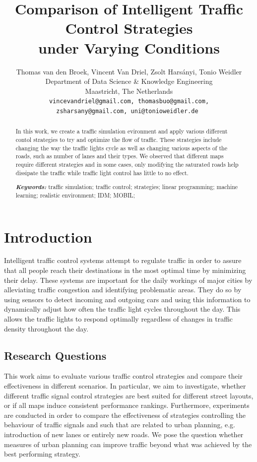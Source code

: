 \documentclass[11pt]{article}
\title{Comparison of Intelligent Traffic Control Strategies\\ under Varying Conditions}
\author{Thomas van den Broek, Vincent Van Driel, Zsolt Harsányi, Tonio Weidler\\
	Department of Data Science \& Knowledge Engineering\\
	Maastricht, The Netherlands\\
	\tt \small vincevandriel@gmail.com, thomasbuo@gmail.com,\\
	\tt \small zsharsany@gmail.com, uni@tonioweidler.de
}
\begin{document}
\maketitle
\begin{abstract}
In this work, we create a traffic simulation evironment and apply various different contol strategies to try and optimize the flow of traffic. These strategies include changing the way the traffic lights cycle as well as changing various aspects of the roads, such as number of lanes and their types. We observed that different maps require different strategies and in some cases, only modifying the saturated roads help dissipate the traffic while traffic light control has little to no effect.

{{\it \bf Keywords:} traffic simulation; traffic control; strategies; linear programming; machine learning; realistic environment; IDM; MOBIL;}
\end{abstract}

\section{Introduction}
Intelligent traffic control systems attempt to regulate traffic in order to assure that all people reach their destinations in the most optimal time by minimizing their delay. These systems are important for the daily workings of major cities by alleviating traffic congestion and identifying problematic areas.  They do so by using sensors to detect incoming and outgoing cars and using this information to dynamically adjust how often the traffic light cycles throughout the day.  This allows the traffic lights to respond optimally regardless of changes in traffic density throughout the day.

\subsection{Research Questions}
This work aims to evaluate various traffic control strategies and compare their effectiveness in different scenarios. In particular, we aim to investigate, whether different traffic signal control strategies are best suited for different street layouts, or if all maps induce consistent performance rankings. Furthermore, experiments are conducted in order to compare the effectiveness of strategies controlling the behaviour of traffic signals and such that are related to urban planning, e.g. introduction of new lanes or entirely new roads. We pose the question whether measures of urban planning can improve traffic beyond what was achieved by the best performing strategy.
\end{document}
